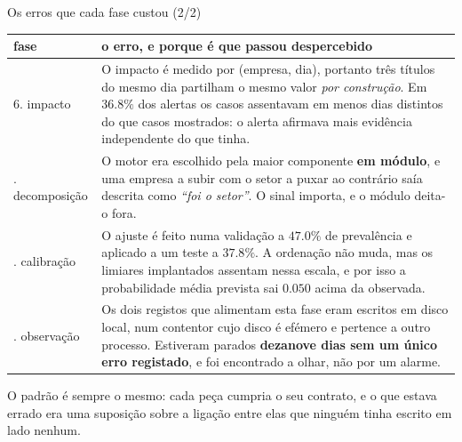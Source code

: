 \documentclass[aspectratio=169]{beamer}
\begin{document}
\begin{frame}{Os erros que cada fase custou (2/2)}
\vspace{2mm}
{\scriptsize
\begin{tabular}{@{}p{}p{}@{}}
\toprule
\textbf{fase} & \textbf{o erro, e porque é que passou despercebido} \\
\midrule
6. impacto & O impacto é medido por (empresa, dia), portanto três títulos do mesmo dia partilham
o mesmo valor \emph{por construção}. Em $36.8\%$ dos alertas os casos assentavam em menos dias
distintos do que casos mostrados: o alerta afirmava mais evidência independente do que tinha. \\
\addlinespace
7. decomposição & O motor era escolhido pela maior componente \textbf{em módulo}, e uma empresa
a subir com o setor a puxar ao contrário saía descrita como \emph{``foi o setor''}. O sinal
importa, e o módulo deita-o fora. \\
\addlinespace
9. calibração & O ajuste é feito numa validação a $47.0\%$ de prevalência e aplicado a um teste a
$37.8\%$. A ordenação não muda, mas os limiares implantados assentam nessa escala, e por isso a
probabilidade média prevista sai $0.050$ acima da observada. \\
\addlinespace
10. observação & Os dois registos que alimentam esta fase eram escritos em disco local, num
contentor cujo disco é efémero e pertence a outro processo. Estiveram parados
\textbf{dezanove dias sem um único erro registado}, e foi encontrado a olhar, não por um alarme. \\
\bottomrule
\end{tabular}}
\vspace{3mm}

\begin{center}\footnotesize
O padrão é sempre o mesmo: cada peça cumpria o seu contrato, e o que estava errado era uma
suposição sobre a ligação entre elas que ninguém tinha escrito em lado nenhum.
\end{center}
\end{frame}
\end{document}

